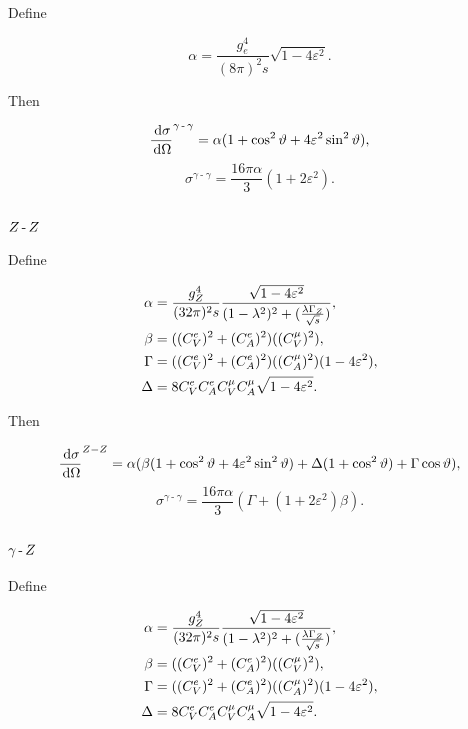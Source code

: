 \documentclass[]{article}
\begin{document}
Define

$$
\alpha = \frac{g_{e}^{4}}{(8\pi)^{2}s} \sqrt{1-4\varepsilon^{2}}.
$$

Then

$$
\frac{\,\operatorname{d}\!{\sigma}}{\,\operatorname{d}\!{\Omega}}^{\gamma\operatorname{-}\gamma} = \alpha (1 + \cos^{2}{\vartheta} + 4\varepsilon^{2}\sin^{2}{\vartheta}),
$$
\begin{equation}
\sigma^{\gamma\operatorname{-}\gamma} = \frac{16\pi\alpha}{3}(1 + 2\varepsilon^{2}).
\end{equation}

\subsection{$Z \operatorname{-}Z $}

Define

\begin{align*}
\alpha &= \frac{g_{\Zzero}^{4}}{(32\pi)^{2}s} \frac{\sqrt{1-4\varepsilon^{2}}}{(1-\lambda^{2})^{2} + (\frac{\lambda\Gamma_{\Zzero}}{\rts})},
\\
\beta &= ((C_{V}^{e})^{2} + (C_{A}^{e})^{2})((C_{V}^{\mu})^{2}),
\\
\Gamma &= ((C_{V}^{e})^{2} + (C_{A}^{e})^{2})((C_{A}^{\mu})^{2})(1-4\varepsilon^{2}),
\\
\Delta &= 8C_{V}^{e}C_{A}^{e}C_{V}^{\mu}C_{A}^{\mu}\sqrt{1-4\varepsilon^{2}}.
\end{align*}

Then

$$
\frac{\,\operatorname{d}\!{\sigma}}{\,\operatorname{d}\!{\Omega}}^{Z -Z }
  = \alpha(\beta(1+\cos^{2}{\vartheta}+4\varepsilon^{2}\sin^{2}{\vartheta})
    + \Delta(1+\cos^{2}{\vartheta})
    + \Gamma\cos{\vartheta}
  ),
$$
\begin{equation}
\sigma^{\gamma\operatorname{-}\gamma} = \frac{16\pi\alpha}{3}(\Gamma + (1 + 2\varepsilon^{2})\beta).
\end{equation}

\subsection{$\gamma\operatorname{-}Z $}

Define

\begin{align*}
\alpha &= \frac{g_{\Zzero}^{4}}{(32\pi)^{2}s} \frac{\sqrt{1-4\varepsilon^{2}}}{(1-\lambda^{2})^{2} + (\frac{\lambda\Gamma_{\Zzero}}{\rts})},
\\
\beta &= ((C_{V}^{e})^{2} + (C_{A}^{e})^{2})((C_{V}^{\mu})^{2}),
\\
\Gamma &= ((C_{V}^{e})^{2} + (C_{A}^{e})^{2})((C_{A}^{\mu})^{2})(1-4\varepsilon^{2}),
\\
\Delta &= 8C_{V}^{e}C_{A}^{e}C_{V}^{\mu}C_{A}^{\mu}\sqrt{1-4\varepsilon^{2}}.
\end{align*}
\end{document}
